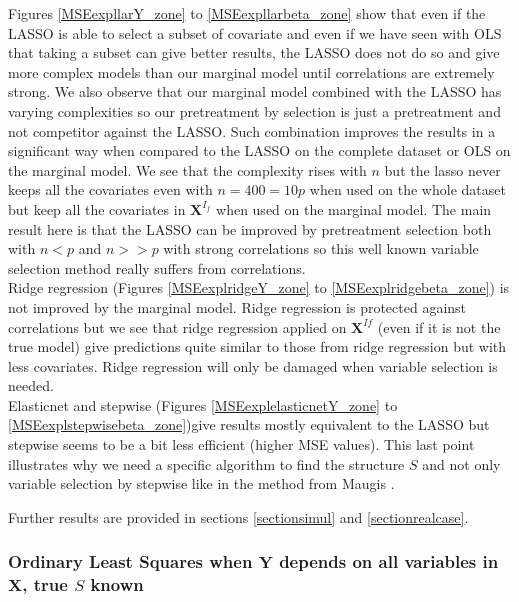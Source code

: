 \documentclass[12pt,a4paper]{report}
\begin{document}
Figures \ref{MSEexpllarY_zone} to \ref{MSEexpllarbeta_zone} show that even if the LASSO is able to select a subset of covariate and even if we have seen with OLS that taking a subset can give better results, the LASSO does not do so and give more complex models than our marginal model until correlations are extremely strong. We also observe that our marginal model combined with the LASSO has varying complexities so our pretreatment by selection is just a pretreatment and not competitor against the LASSO. Such combination improves the results in a significant way when compared to the LASSO on the complete dataset or OLS on the marginal model. We see that the complexity rises with $n$ but the lasso never keeps all the covariates even with $n=400=10p$ when used on the whole dataset but keep all the covariates in $\boldsymbol{X}^{I_f}$ when used on the marginal model. The main result here is that the LASSO can be improved by pretreatment selection both with $n<p$ and $n>>p$ with strong correlations so this well known variable selection method really suffers from correlations. \\

Ridge regression (Figures \ref{MSEexplridgeY_zone} to \ref{MSEexplridgebeta_zone}) is not improved by the marginal model. Ridge regression is protected against correlations but we see that ridge regression applied on $\boldsymbol{X}^{If}$ (even if it is not the true model) give predictions quite similar to those from ridge regression but with less covariates. Ridge regression will only be damaged when variable selection is needed. \\


Elasticnet and stepwise (Figures \ref{MSEexplelasticnetY_zone} to \ref{MSEexplstepwisebeta_zone})give results mostly equivalent to the LASSO but stepwise seems to be a bit less efficient (higher MSE values). This last point illustrates why we need a specific algorithm to find the structure $S$ and not only variable selection by stepwise like in the method from Maugis \cite{maugis2009variable}.


Further results are provided in sections \ref{sectionsimul} and \ref{sectionrealcase}.
	\FloatBarrier

\newpage
\subsubsection{Ordinary Least Squares when $\boldsymbol{Y}$ depends on all variables in $\boldsymbol{X}$, true $S$ known}
\end{document}

